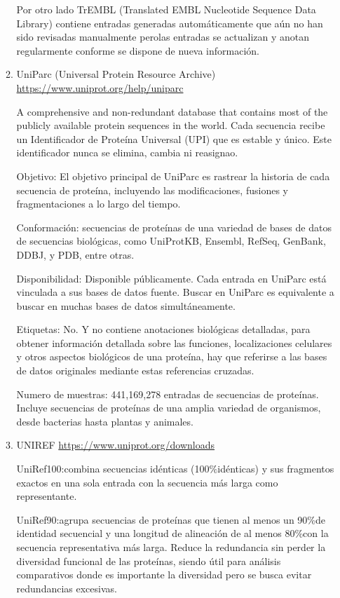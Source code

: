 \documentclass[11pt, twoside]{report}
\begin{document}
\begin{itemize}
\begin{enumerate}
        Por otro lado TrEMBL (Translated EMBL Nucleotide Sequence Data Library) contiene entradas generadas automáticamente que aún no han sido revisadas manualmente perolas entradas  se actualizan y anotan regularmente conforme se dispone de nueva información.

       

        \item UniParc (Universal Protein Resource Archive) 
        \url{https://www.uniprot.org/help/uniparc}

        
        A comprehensive and non-redundant database that contains most of the publicly available protein sequences in the world. Cada secuencia recibe un Identificador de Proteína Universal (UPI) que es estable y único. Este identificador nunca se elimina, cambia ni reasignao.

        Objetivo: El objetivo principal de UniParc es rastrear la historia de cada secuencia de proteína, incluyendo las modificaciones, fusiones y fragmentaciones a lo largo del tiempo. 

        Conformación: secuencias de proteínas de una variedad de bases de datos de secuencias biológicas, como UniProtKB, Ensembl, RefSeq, GenBank, DDBJ, y PDB, entre otras.

        Disponibilidad: Disponible públicamente. Cada entrada en UniParc está vinculada a sus bases de datos fuente. Buscar en UniParc es equivalente a buscar en muchas bases de datos simultáneamente.

        Etiquetas: No. Y no contiene anotaciones biológicas detalladas, para obtener información detallada sobre las funciones, localizaciones celulares y otros aspectos biológicos de una proteína, hay que referirse a las bases de datos originales mediante estas referencias cruzadas.

        Numero de muestras: 441,169,278 entradas de secuencias de proteínas. Incluye secuencias de proteínas de una amplia variedad de organismos, desde bacterias hasta plantas y animales.

        \item UNIREF \url{https://www.uniprot.org/downloads}
        
        UniRef100:combina secuencias idénticas (100$\% $idénticas) y sus fragmentos exactos en una sola entrada con la secuencia más larga como representante.
    
        UniRef90:agrupa secuencias de proteínas que tienen al menos un 90$\% $de identidad secuencial y una longitud de alineación de al menos 80$\% $con la secuencia representativa más larga. Reduce la redundancia sin perder la diversidad funcional de las proteínas, siendo útil para análisis comparativos donde es importante la diversidad pero se busca evitar redundancias excesivas.
        

\end{enumerate}
\end{itemize}
\end{document}
